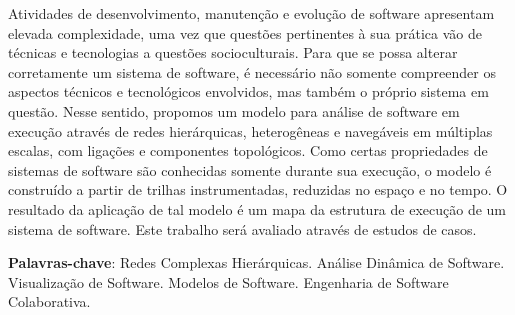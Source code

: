 
%
%

\begin{resumo}
    Atividades de desenvolvimento, manutenção e evolução de software apresentam
    elevada complexidade, uma vez que questões pertinentes à sua prática vão de
    técnicas e tecnologias a questões socioculturais. Para que se possa alterar
    corretamente um sistema de software, é necessário não somente compreender os
    aspectos técnicos e tecnológicos envolvidos, mas também o próprio sistema em
    questão. Nesse sentido, propomos um modelo para análise de software em
    execução através de redes hierárquicas, heterogêneas e navegáveis em
    múltiplas escalas, com ligações e componentes topológicos. Como certas
    propriedades de sistemas de software são conhecidas somente durante sua
    execução, o modelo é construído a partir de trilhas instrumentadas,
    reduzidas no espaço e no tempo. O resultado da aplicação de tal modelo é um
    mapa da estrutura de execução de um sistema de software. Este trabalho será
    avaliado através de estudos de casos.

    \textbf{Palavras-chave}: Redes Complexas Hierárquicas.
    Análise Dinâmica de Software. Visualização de Software. Modelos de Software.
    Engenharia de Software Colaborativa.
\end{resumo}
